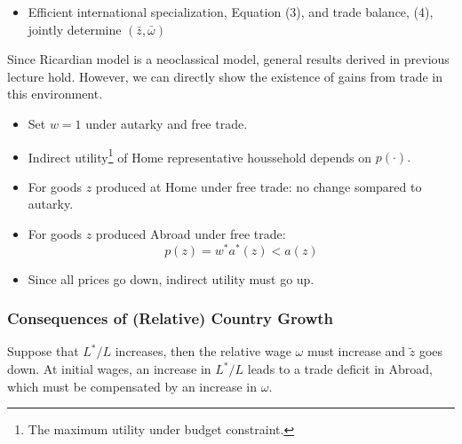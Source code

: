 \begin{itemize}
    \item Efficient international specialization, Equation (3), and trade balance, (4), jointly determine $(\bar{z}, \bar{\omega})$
\end{itemize}

Since Ricardian model is a neoclassical model, general results derived
in previous lecture hold. However, we can directly show the existence of gains from trade in this environment.

\begin{itemize}
    \item Set $w=1$ under autarky and free trade.
    \item Indirect utility\footnote{The maximum utility under budget constraint.} of Home representative houssehold depends on $p(\cdot).$
    \item For goods $z$ produced at Home under free trade: no change sompared to autarky.
    \item For goods $z$ produced Abroad under free trade:
    \[p(z) = w^* a^*(z) < a(z)\]
    \item Since all prices go down, indirect utility must go up.
\end{itemize}

\subsubsection{Consequences of (Relative) Country Growth}

Suppose that $L^*/L$ increases, then the relative wage $\omega$ must increase and $\tilde{z}$ goes down.
At initial wages, an increase in $L^*/L$ leads to a trade deficit in Abroad, which must be compensated by an increase in $\omega$.